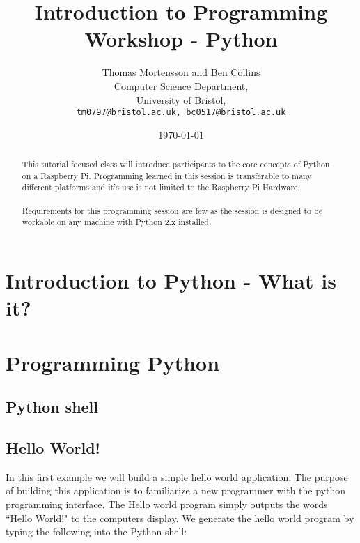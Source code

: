 \documentclass[twocolumn]{article}
\begin{document}
\lstset{language=Python,showstringspaces=false,frame=tlrb}

\title{Introduction to Programming Workshop - Python} 
\author{Thomas Mortensson and Ben Collins\\
        	Computer Science Department,\\
		University of Bristol,\\
		\texttt{tm0797@bristol.ac.uk, 
		bc0517@bristol.ac.uk}} 
\date{\today} 
\maketitle

\begin{abstract}
This tutorial focused class will introduce participants to the core concepts of Python on a Raspberry Pi. Programming learned in this session is transferable to many different platforms and it's use is not limited to the Raspberry Pi Hardware.\\
\\
Requirements for this programming session are  few as the session is designed to be workable on any machine with Python 2.x installed.
\end{abstract}

\section{Introduction to Python - What is it?}

\section {Programming Python}



\subsection{Python shell}

\subsection{Hello World!}

In this first example we will build a simple hello world application. The purpose of building this application is to familiarize a new programmer with the python programming interface. The Hello world program simply outputs the words ``Hello World!" to the computers display. We generate the hello world program by typing the following into the Python shell:\\
\end{document}
